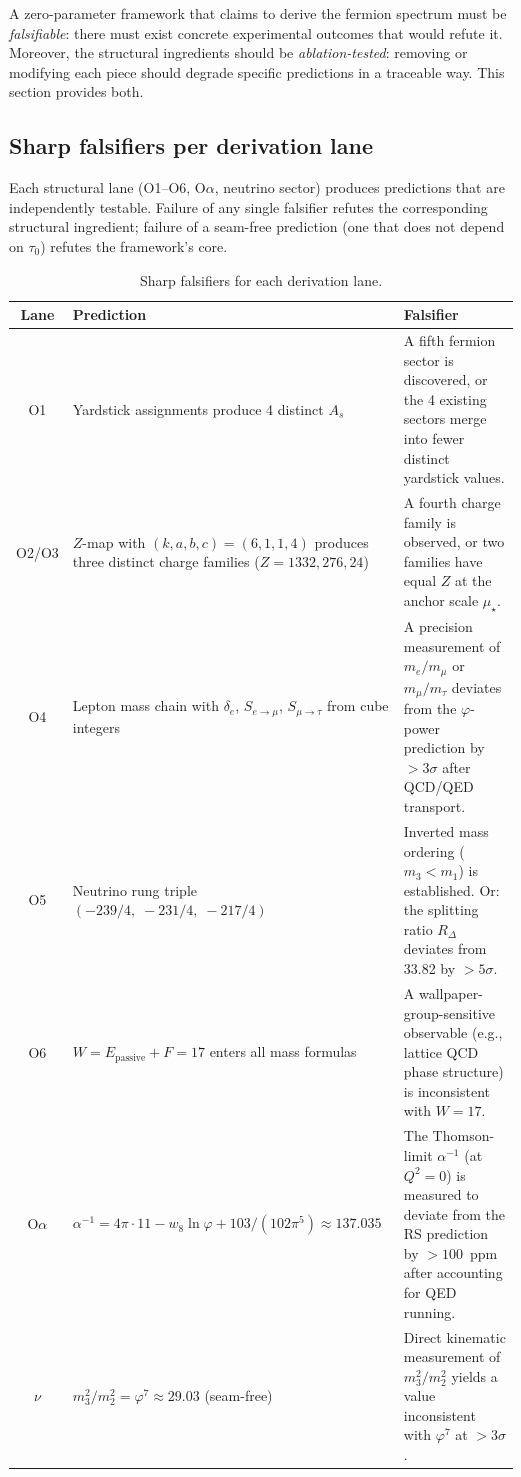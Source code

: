\documentclass[11pt,a4paper]{article}
\theoremstyle{definition}
\theoremstyle{remark}
\newcommand{\phig}{\varphi}
\newcommand{\muStar}{\mu_{\star}}
\newcommand{\Epass}{E_{\mathrm{passive}}}
\newcommand{\Zidx}{Z}
\newcommand{\weig}{w_8}
\begin{document}
A zero-parameter framework that claims to derive the fermion spectrum must be
\emph{falsifiable}: there must exist concrete experimental outcomes that would
refute it.  Moreover, the structural ingredients should be \emph{ablation-tested}:
removing or modifying each piece should degrade specific predictions in a
traceable way.  This section provides both.

\subsection{Sharp falsifiers per derivation lane}

Each structural lane (O1--O6, O$\alpha$, neutrino sector) produces predictions
that are independently testable.  Failure of any single falsifier refutes the
corresponding structural ingredient; failure of a seam-free prediction
(one that does not depend on $\tau_0$) refutes the framework's core.

\begin{table}[h]
\centering
\caption{Sharp falsifiers for each derivation lane.}
\label{tab:falsifiers}
\small
\begin{tabular}{@{}cp{4.5cm}p{6.5cm}@{}}
\toprule
Lane & Prediction & Falsifier \\
\midrule
O1 &
  Yardstick assignments produce 4 distinct $A_s$ &
  A fifth fermion sector is discovered, or the 4 existing sectors merge
  into fewer distinct yardstick values. \\[4pt]
O2/O3 &
  $\Zidx$-map with $(k,a,b,c) = (6,1,1,4)$ produces three distinct
  charge families ($\Zidx = 1332, 276, 24$) &
  A fourth charge family is observed, or two families have equal $\Zidx$
  at the anchor scale $\muStar$. \\[4pt]
O4 &
  Lepton mass chain with $\delta_e$, $S_{e\to\mu}$, $S_{\mu\to\tau}$
  from cube integers &
  A precision measurement of $m_e/m_\mu$ or $m_\mu/m_\tau$ deviates
  from the $\phig$-power prediction by $> 3\sigma$ after QCD/QED transport. \\[4pt]
O5 &
  Neutrino rung triple
  $(-239/4,\; -231/4,\; -217/4)$ &
  Inverted mass ordering ($m_3 < m_1$) is established.  Or: the
  splitting ratio $R_\Delta$ deviates from 33.82 by $> 5\sigma$. \\[4pt]
O6 &
  $W = \Epass + F = 17$ enters all mass formulas &
  A wallpaper-group-sensitive observable (e.g., lattice QCD phase
  structure) is inconsistent with $W = 17$. \\[4pt]
O$\alpha$ &
  $\alpha^{-1} = 4\pi \cdot 11 - \weig\ln\phig + 103/(102\pi^5)
  \approx 137.035$ &
  The Thomson-limit $\alpha^{-1}$ (at $Q^2 = 0$) is measured to deviate
  from the RS prediction by $> 100$~ppm after accounting for QED
  running.\footnotemark \\[4pt]
$\nu$ &
  $m_3^2/m_2^2 = \phig^7 \approx 29.03$ (seam-free) &
  Direct kinematic measurement of $m_3^2/m_2^2$ yields a value
  inconsistent with $\phig^7$ at $> 3\sigma$. \\
\bottomrule
\end{tabular}
\end{table}
\end{document}
